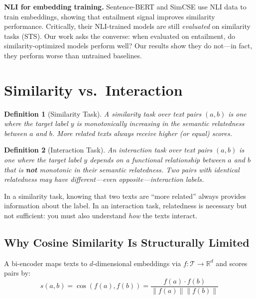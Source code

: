 \documentclass{article}
\newtheorem{definition}{Definition}
\begin{document}
\textbf{NLI for embedding training.} Sentence-BERT \citep{reimers2019sentence} and SimCSE \citep{gao2021simcse} use NLI data to train embeddings, showing that entailment signal improves similarity performance. Critically, their NLI-trained models are still \emph{evaluated} on similarity tasks (STS). Our work asks the converse: when evaluated on entailment, do similarity-optimized models perform well? Our results show they do not---in fact, they perform worse than untrained baselines.

\section{Similarity vs.\ Interaction}
\label{sec:problem}

\begin{definition}[Similarity Task]
\label{def:similarity}
A \emph{similarity task} over text pairs $(a, b)$ is one where the target label $y$ is monotonically increasing in the semantic relatedness between $a$ and $b$. More related texts always receive higher (or equal) scores.
\end{definition}

\begin{definition}[Interaction Task]
\label{def:interaction}
An \emph{interaction task} over text pairs $(a, b)$ is one where the target label $y$ depends on a functional relationship between $a$ and $b$ that is \textbf{not} monotonic in their semantic relatedness. Two pairs with identical relatedness may have different---even opposite---interaction labels.
\end{definition}

In a similarity task, knowing that two texts are ``more related'' always provides information about the label. In an interaction task, relatedness is necessary but not sufficient: you must also understand \emph{how} the texts interact.

\subsection{Why Cosine Similarity Is Structurally Limited}

A bi-encoder maps texts to $d$-dimensional embeddings via $f: \mathcal{T} \to \mathbb{R}^d$ and scores pairs by:
\begin{equation}
    s(a, b) = \cos(f(a), f(b)) = \frac{f(a) \cdot f(b)}{\|f(a)\| \|f(b)\|}
\end{equation}
\end{document}
